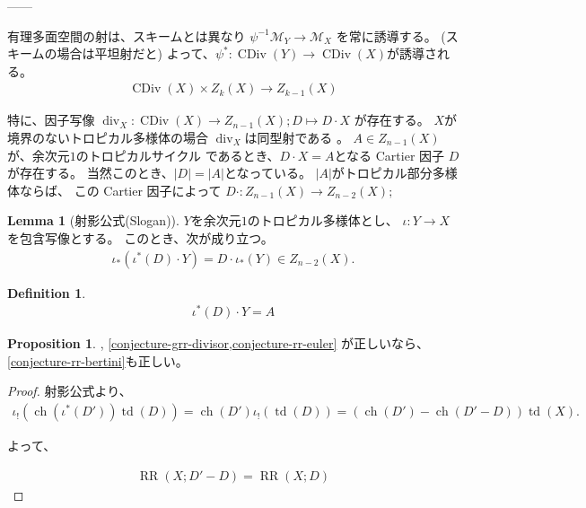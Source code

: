 \documentclass[a4paper,dvipdfmx,reqno,12pt]{amsart}
\theoremstyle{definition}
\newtheorem{definition}[theorem]{Definition}
\newtheorem{proposition}[theorem]{Proposition}
\newtheorem{lemma}[theorem]{Lemma}
\newcommand{\opn}[1]{\operatorname{#1}}
\numberwithin{equation}{section}
\begin{document}
------

有理多面空間の射は、スキームとは異なり
$\psi^{-1}\mathcal{M}_Y\to \mathcal{M}_X$
を常に誘導する。
(スキームの場合は平坦射だと)
よって、$\psi^{*}\colon 
\opn{CDiv}(Y)\to \opn{CDiv}(X)$が誘導される。
\begin{align}
\opn{CDiv}(X)\times Z_{k}(X)\to Z_{k-1}(X)
\end{align}


特に、因子写像
$\opn{div}_X\colon \opn{CDiv}(X)\to Z_{n-1}(X); 
D\mapsto D\cdot X$
が存在する。
$X$が境界のないトロピカル多様体の場合
$\opn{div}_X$は同型射である
\cite[Theorem 4.5]{}。
$A\in Z_{n-1}(X)$ が、余次元$1$のトロピカルサイクル
であるとき、$D\cdot X=A$となる
Cartier 因子 $D$ が存在する。
当然このとき、$|D|=|A|$となっている。
$|A|$がトロピカル部分多様体ならば、
この Cartier 因子によって
$D\cdot \colon Z_{n-1}(X)\to Z_{n-2}(X); $

\begin{lemma}[{射影公式(Slogan)\cite[Proposition 7.7]{}}]
$Y$を余次元$1$のトロピカル多様体とし、
$\iota\colon Y\to X$を包含写像とする。
このとき、次が成り立つ。
\begin{align}
\iota_{*}(\iota^{*}(D)\cdot Y)
=D\cdot \iota_*(Y)\in Z_{n-2}(X).
\end{align}


\end{lemma}

\begin{definition}

\begin{align}
     \iota^{*}(D)\cdot Y=A
\end{align}

\end{definition}



\begin{proposition}
\cite[Conjecture 6.13]{demedrano2023chern},
\cref{conjecture-grr-divisor,conjecture-rr-euler}
が正しいなら、\cref{conjecture-rr-bertini}も正しい。  
\end{proposition}

\begin{proof}
射影公式より、
\begin{align}
\iota_!(\opn{ch}(\iota^{*}(D'))\opn{td}(D))
=\opn{ch}(D')\iota_!(\opn{td}(D))
=(\opn{ch}(D')-\opn{ch}(D'-D))\opn{td}(X).
\end{align}

よって、

\begin{align}
\opn{RR}(X;D'-D)=\opn{RR}(X;D)
\end{align}


\end{proof}
\end{document}
